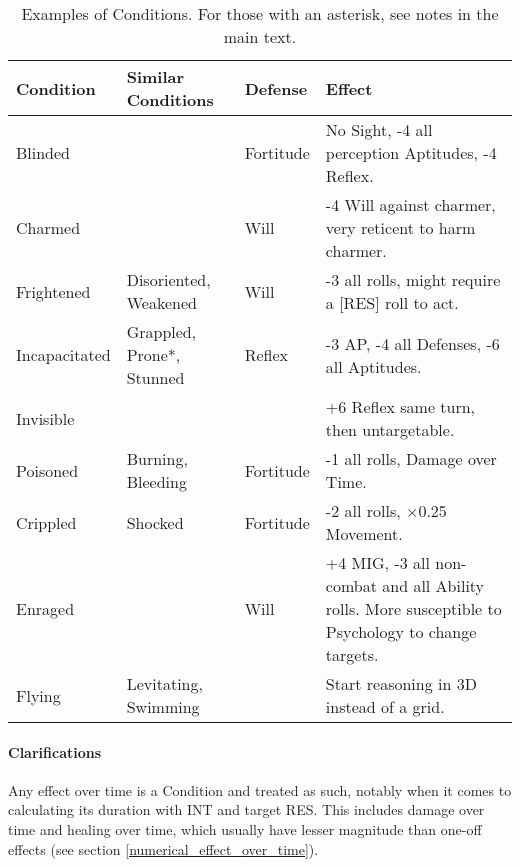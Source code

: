 \begin{table*}[h!tbp]
	\begin{center}
		\begin{tabular}{p{2.5cm}p{3.5cm}p{2cm}p{8cm}} \toprule
			
		    \textbf{Condition} & \textbf{Similar Conditions} & \textbf{Defense} & \textbf{Effect} \\ \midrule

		    Blinded & & Fortitude & No Sight, -4 all perception Aptitudes, -4 Reflex. \\[4mm] 
		    Charmed & & Will & -4 Will against charmer, very reticent to harm charmer. \\[4mm] 
		    Frightened & Disoriented, Weakened & Will & -3 all rolls, might require a [RES] roll to act. \\[4mm] 
            Incapacitated & Grappled, Prone*, Stunned & Reflex & -3 AP, -4 all Defenses, -6 all Aptitudes. \\[4mm]
			Invisible & & & +6 Reflex same turn, then untargetable. \\[4mm] 
            Poisoned & Burning, Bleeding & Fortitude & -1 all rolls, Damage over Time. \\[4mm] 
            Crippled & Shocked & Fortitude & -2 all rolls, $\times$0.25 Movement. \\[4mm] 
            Enraged & & Will & +4 MIG, -3 all non-combat and all Ability rolls. More susceptible to Psychology to change targets. \\[6mm] 
            Flying & Levitating, Swimming & & Start reasoning in 3D instead of a grid. \\[4mm] 

		    \bottomrule
		\end{tabular}
	\end{center}
	\caption{Examples of Conditions. For those with an asterisk, see notes in the main text.}
  \label{conditions_table}
\end{table*}


\paragraph{Clarifications} 

Any effect over time is a Condition and treated as such, notably when it comes to calculating its duration with INT and target RES. This includes damage over time and healing over time, which usually have lesser magnitude than one-off effects (see section \ref{numerical_effect_over_time}).

